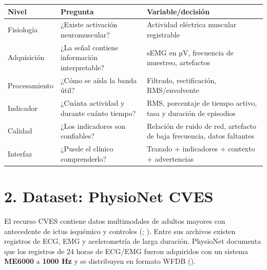 \documentclass[
  spanish,
  a4paper,
  DIV=11,
  numbers=noendperiod]{scrreprt}
\newcounter{none} %
\begin{document}
{\def\LTcaptype{none} %
\begin{longtable}[]{@{}
  >{\raggedright\arraybackslash}p{}
  >{\raggedright\arraybackslash}p{}
  >{\raggedright\arraybackslash}p{}@{}}
\toprule\noalign{}
\begin{minipage}[b]{\linewidth}\raggedright
Nivel
\end{minipage} & \begin{minipage}[b]{\linewidth}\raggedright
Pregunta
\end{minipage} & \begin{minipage}[b]{\linewidth}\raggedright
Variable/decisión
\end{minipage} \\
\midrule\noalign{}
\endhead
\bottomrule\noalign{}
\endlastfoot
Fisiología & ¿Existe activación neuromuscular? & Actividad eléctrica
muscular registrable \\
Adquisición & ¿La señal contiene información interpretable? & sEMG en
µV, frecuencia de muestreo, artefactos \\
Procesamiento & ¿Cómo se aísla la banda útil? & Filtrado, rectificación,
RMS/envolvente \\
Indicador & ¿Cuánta actividad y durante cuánto tiempo? & RMS, porcentaje
de tiempo activo, tasa y duración de episodios \\
Calidad & ¿Los indicadores son confiables? & Relación de ruido de red,
artefacto de baja frecuencia, datos faltantes \\
Interfaz & ¿Puede el clínico comprenderlo? & Trazado + indicadores +
contexto + advertencias \\
\end{longtable}
}

\chapter{2. Dataset: PhysioNet CVES}\label{dataset-physionet-cves}

El recurso CVES contiene datos multimodales de adultos mayores con
antecedente de ictus isquémico y controles
(;
). Entre sus archivos existen
registros de ECG, EMG y acelerometría de larga duración. PhysioNet
documenta que los registros de 24 horas de ECG/EMG fueron adquiridos con
un sistema \textbf{ME6000} a \textbf{1000 Hz} y se distribuyen en
formato WFDB ().
\end{document}
